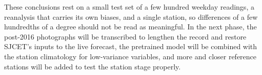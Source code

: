 These conclusions rest on a small test set of a few hundred weekday readings, a reanalysis that carries its own biases, and a single station, so differences of a few hundredths of a degree should not be read as meaningful. In the next phase, the post-2016 photographs will be transcribed to lengthen the record and restore SJCET's inputs to the live forecast, the pretrained model will be combined with the station climatology for low-variance variables, and more and closer reference stations will be added to test the station stage properly.
